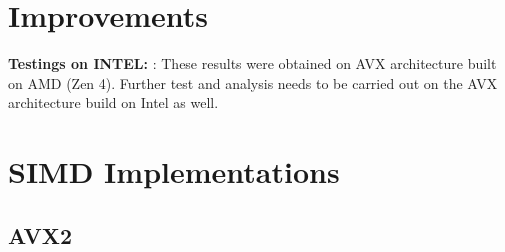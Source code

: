 \documentclass{article}
\newcommand{\pointlabel}[1]{\par\smallskip\noindent\textbf{\textcolor{accentorange}{#1:}} }
\begin{document}
\section{Improvements}
\pointlabel{Testings on INTEL}: These results were obtained on AVX architecture built on AMD (Zen 4). Further test and analysis needs to be carried out on the AVX architecture build on Intel as well.
\printbibliography

\newpage
\appendix
\section{SIMD Implementations}
\label{app:code}


\subsection{AVX2}
\end{document}
